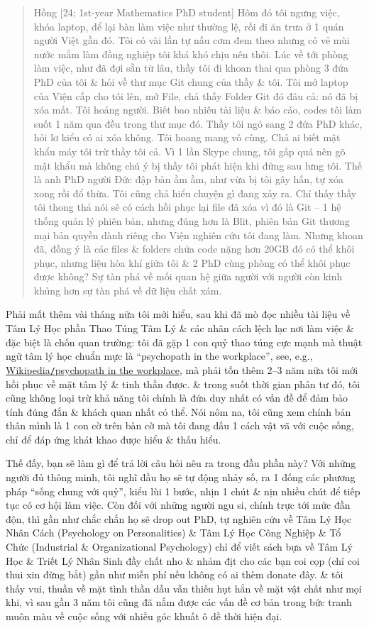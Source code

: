 \documentclass[12pt,oneside]{book}
\begin{document}
\begin{quote}
	{\sf Hồng [24; 1st-year Mathematics PhD student]} Hôm đó tôi ngưng việc, khóa laptop, để lại bàn làm việc  như thường lệ, rồi đi ăn trưa ở 1 quán người Việt gần đó. Tôi có vài lần tự nấu cơm đem theo nhưng có vẻ mùi nước mắm làm đồng nghiệp tôi khá khó chịu nên thôi. Lúc về tới phòng làm việc, như đã đợi sẵn từ lâu, thầy tôi đi khoan thai qua phòng 3 đứa PhD của tôi \& hỏi về thư mục Git chung của thầy \& tôi. Tôi mở laptop của Viện cấp cho tôi lên, mở File, chả thấy Folder Git đó đâu cả: nó đã bị xóa mất. Tôi hoảng người. Biết bao nhiêu tài liệu \& báo cáo, codes tôi làm suốt 1 năm qua đều trong thư mục đó. Thầy tôi ngó sang 2 đứa PhD khác, hỏi lơ kiểu có ai xóa không. Tôi hoang mang vô cùng. Chả ai biết mật khẩu máy tôi trừ thầy tôi cả. Vì 1 lần Skype chung, tôi gấp quá nên gõ mật khẩu mà không chú ý bị thầy tôi phát hiện khi đứng sau lưng tôi. Thế là anh PhD người Đức đập bàn ầm ầm, như vừa bị tôi gây hấn, tự xóa xong rồi đổ thừa. Tôi cũng chả hiểu chuyện gì đang xảy ra. Chỉ thấy thầy tôi thong thả nói sẽ có cách hồi phục lại file đã xóa vì đó là Git -- 1 hệ thống quản lý phiên bản, nhưng đúng hơn là Blit, phiên bản Git thương mại bản quyền dành riêng cho Viện nghiên cứu tôi đang làm. Nhưng khoan đã, đồng ý là các files \& folders chứa code nặng hơn 20GB đó có thể khôi phục, nhưng liệu hòa khí giữa tôi \& 2 PhD cùng phòng có thể khôi phục được không? Sự tàn phá về mối quan hệ giữa người với người còn kinh khủng hơn sự tàn phá về dữ liệu chất xám.
\end{quote}
Phải mất thêm vài tháng nữa tôi mới hiểu, sau khi đã mò đọc nhiều tài liệu về Tâm Lý Học phần Thao Túng Tâm Lý \& các nhân cách lệch lạc nơi làm việc \& đặc biệt là chốn quan trường: tôi đã gặp 1 con quỷ thao túng cực mạnh mà thuật ngữ tâm lý học chuẩn mực là ``psychopath in the workplace'', see, e.g., \href{https://en.wikipedia.org/wiki/Psychopathy_in_the_workplace}{Wikipedia{\tt/}psychopath in the workplace}, mà phải tốn thêm 2--3 năm nữa tôi mới hồi phục về mặt tâm lý \& tinh thần được. \& trong suốt thời gian phản tư đó, tôi cũng không loại trừ khả năng tôi chính là đứa duy nhất có vấn đề để đảm bảo tính đúng đắn \& khách quan nhất có thể. Nói nôm na, tôi cũng xem chính bản thân mình là 1 con cờ trên bàn cờ mà tôi đang đấu 1 cách vật vã với cuộc sống, chỉ để đáp ứng khát khao được hiểu \& thấu hiểu.

Thế đấy, bạn sẽ làm gì để trả lời câu hỏi nêu ra trong đầu phần này? Với những người đủ thông minh, tôi nghĩ đầu họ sẽ tự động nhảy số, ra 1 đống các phương pháp ``sống chung với quỷ'', kiểu lùi 1 bước, nhịn 1 chút \& nịn nhiều chút để tiếp tục có cơ hội làm việc. Còn đối với những người ngu si, chính trực tới mức đần độn, thì gần như chắc chắn họ sẽ drop out PhD, tự nghiên cứu về Tâm Lý Học Nhân Cách (Psychology on Personalities) \& Tâm Lý Học Công Nghiệp \& Tổ Chức (Industrial \& Organizational Psychology) chỉ để viết sách bựa về Tâm Lý Học \& Triết Lý Nhân Sinh đầy chất nho \& nhảm địt cho các bạn coi cọp (chỉ coi thui xin đừng bắt) gần như miễn phí nếu không có ai thèm donate đây. \& tôi thấy vui, thuần về mặt tình thần dẫu vẫn thiếu hụt hẳn về mặt vật chất như mọi khi, vì sau gần 3 năm tôi cũng đã nắm được các vấn đề cơ bản trong bức tranh muôn màu về cuộc sống với nhiều góc khuất ô dề thời hiện đại.
\end{document}

